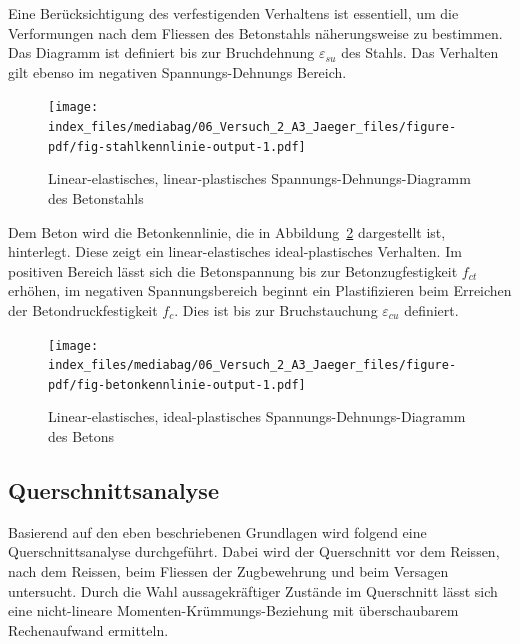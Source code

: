 \documentclass[
  12pt,
  letterpaper,
  egregdoesnotlikesansseriftitles]{scrreprt}
\begin{document}
Eine Berücksichtigung des verfestigenden Verhaltens ist essentiell, um
die Verformungen nach dem Fliessen des Betonstahls näherungsweise zu
bestimmen. Das Diagramm ist definiert bis zur Bruchdehnung
\(\varepsilon_{su}\) des Stahls. Das Verhalten gilt ebenso im negativen
Spannungs-Dehnungs Bereich.

\begin{figure}[H]

{\centering \texttt{[image: index\_files/mediabag/06\_Versuch\_2\_A3\_Jaeger\_files/figure-pdf/fig-stahlkennlinie-output-1.pdf]}

}

\caption{\label{fig-stahlkennlinie}Linear-elastisches,
linear-plastisches Spannungs-Dehnungs-Diagramm des Betonstahls}

\end{figure}

Dem Beton wird die Betonkennlinie, die in
Abbildung~\ref{fig-betonkennlinie} dargestellt ist, hinterlegt. Diese
zeigt ein linear-elastisches ideal-plastisches Verhalten. Im positiven
Bereich lässt sich die Betonspannung bis zur Betonzugfestigkeit
\(f_{ct}\) erhöhen, im negativen Spannungsbereich beginnt ein
Plastifizieren beim Erreichen der Betondruckfestigkeit \(f_c\). Dies ist
bis zur Bruchstauchung \(\varepsilon_{cu}\) definiert.

\begin{figure}[H]

{\centering \texttt{[image: index\_files/mediabag/06\_Versuch\_2\_A3\_Jaeger\_files/figure-pdf/fig-betonkennlinie-output-1.pdf]}

}

\caption{\label{fig-betonkennlinie}Linear-elastisches, ideal-plastisches
Spannungs-Dehnungs-Diagramm des Betons}

\end{figure}

\hypertarget{querschnittsanalyse}{%
\subsection{Querschnittsanalyse}\label{querschnittsanalyse}}

Basierend auf den eben beschriebenen Grundlagen wird folgend eine
Querschnittsanalyse durchgeführt. Dabei wird der Querschnitt vor dem
Reissen, nach dem Reissen, beim Fliessen der Zugbewehrung und beim
Versagen untersucht. Durch die Wahl aussagekräftiger Zustände im
Querschnitt lässt sich eine nicht-lineare Momenten-Krümmungs-Beziehung
mit überschaubarem Rechenaufwand ermitteln.
\end{document}
